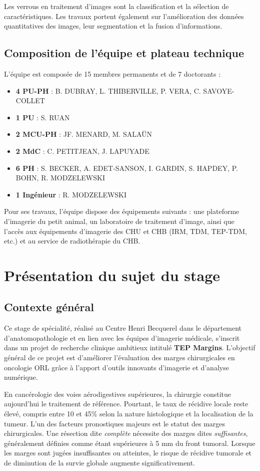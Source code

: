 \documentclass[12pt,a4paper]{report}
\begin{document}
Les verrous en traitement d'images sont la classification et la sélection de caractéristiques. Les travaux portent également sur l'amélioration des données quantitatives des images, leur segmentation et la fusion d'informations.

\section{Composition de l'équipe et plateau technique}

L'équipe est composée de 15 membres permanents et de 7 doctorants :

\begin{itemize}
\item \textbf{4 PU-PH} : B. DUBRAY, L. THIBERVILLE, P. VERA, C. SAVOYE-COLLET
\item \textbf{1 PU} : S. RUAN
\item \textbf{2 MCU-PH} : JF. MENARD, M. SALAÜN
\item \textbf{2 MdC} : C. PETITJEAN, J. LAPUYADE
\item \textbf{6 PH} : S. BECKER, A. EDET-SANSON, I. GARDIN, S. HAPDEY, P. BOHN, R. MODZELEWSKI
\item \textbf{1 Ingénieur} : R. MODZELEWSKI
\end{itemize}

Pour ses travaux, l'équipe dispose des équipements suivants : une plateforme d'imagerie du petit animal, un laboratoire de traitement d'image, ainsi que l'accès aux équipements d'imagerie des CHU et CHB (IRM, TDM, TEP-TDM, etc.) et au service de radiothérapie du CHB.

\chapter{Présentation du sujet du stage}

\section{Contexte général}

Ce stage de spécialité, réalisé au Centre Henri Becquerel dans le département d'anatomopathologie et en lien avec les équipes d'imagerie médicale, s'inscrit dans un projet de recherche clinique ambitieux intitulé \textbf{TEP Margins}. L'objectif général de ce projet est d'améliorer l'évaluation des marges chirurgicales en oncologie ORL grâce à l'apport d'outils innovants d'imagerie et d'analyse numérique.

En cancérologie des voies aérodigestives supérieures, la chirurgie constitue aujourd'hui le traitement de référence. Pourtant, le taux de récidive locale reste élevé, compris entre 10 et 45\% selon la nature histologique et la localisation de la tumeur. L'un des facteurs pronostiques majeurs est le statut des marges chirurgicales. Une résection dite \textit{complète} nécessite des marges dites \textit{suffisantes}, généralement définies comme étant supérieures à 5 mm du front tumoral. Lorsque les marges sont jugées insuffisantes ou atteintes, le risque de récidive tumorale et de diminution de la survie globale augmente significativement.
\end{document}
